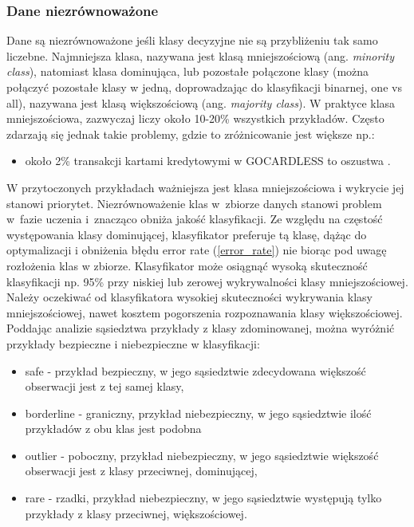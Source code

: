\subsubsection{Dane niezrównoważone}
Dane są niezrównoważone jeśli klasy decyzyjne nie są przybliżeniu tak samo liczebne. Najmniejsza klasa, nazywana jest klasą mniejszościową (ang. \textit{minority class}), natomiast klasa dominująca, lub pozostałe połączone klasy (można połączyć pozostałe klasy w jedną, doprowadzając do klasyfikacji binarnej, one vs all), nazywana jest klasą większościową (ang. \textit{majority class}). W praktyce klasa mniejszościowa, zazwyczaj liczy około 10-20\% wszystkich przykładów. Często zdarzają się jednak takie problemy, gdzie to zróżnicowanie jest większe np.:
\begin{itemize}
	\item około 2\% transakcji kartami kredytowymi w GOCARDLESS to oszustwa \cite{gocardless}.

\end{itemize}
W przytoczonych przykładach ważniejsza jest klasa mniejszościowa i wykrycie jej stanowi priorytet. Niezrównoważenie klas w zbiorze danych stanowi problem w fazie uczenia i znacząco obniża jakość klasyfikacji. Ze względu na częstość występowania klasy dominującej, klasyfikator preferuje tą klasę, dążąc do optymalizacji i obniżenia błędu error rate (\ref{error_rate}) nie biorąc pod uwagę rozłożenia klas w zbiorze. Klasyfikator może osiągnąć wysoką skuteczność klasyfikacji np. 95\% przy niskiej lub zerowej wykrywalności klasy mniejszościowej. 
Należy oczekiwać od klasyfikatora wysokiej skuteczności wykrywania klasy mniejszościowej, nawet kosztem pogorszenia rozpoznawania klasy większościowej.
Poddając analizie sąsiedztwa przykłady z klasy zdominowanej, można wyróżnić przykłady bezpieczne i niebezpieczne w klasyfikacji:
\begin{itemize}
	\item safe - przykład bezpieczny, w jego sąsiedztwie zdecydowana większość obserwacji jest z tej samej klasy,
	\item borderline - graniczny, przykład niebezpieczny, w jego sąsiedztwie ilość przykładów z obu klas jest podobna
	\item outlier - poboczny, przykład niebezpieczny, w jego sąsiedztwie większość obserwacji jest z klasy przeciwnej, dominującej,
	\item rare - rzadki, przykład niebezpieczny, w jego sąsiedztwie występują tylko przykłady z klasy przeciwnej, większościowej.
\end{itemize}

